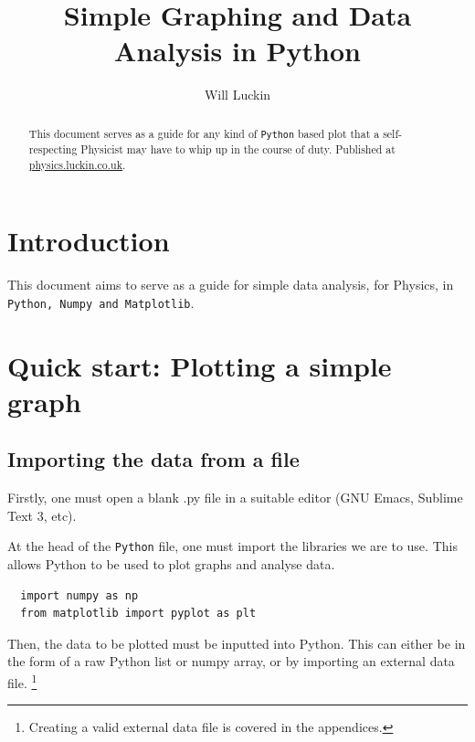 \documentclass{article}
\author{Will Luckin}
\title{Simple Graphing and Data Analysis in Python}
\begin{document}


\maketitle

\begin{abstract}
  This document serves as a guide for any kind of \texttt{Python}
  based plot that a self-respecting Physicist may have to whip up in
  the course of duty.
  Published at \url{physics.luckin.co.uk}.
\end{abstract}

\tableofcontents
\newpage

\section{Introduction}
This document aims to serve as a guide for simple data analysis, for
Physics, in \texttt{Python, Numpy and Matplotlib}.  

\section{Quick start: Plotting a simple graph}
\subsection{Importing the data from a file}
Firstly, one must open a blank .py file in a suitable editor (GNU
Emacs, Sublime Text 3, etc).

At the head of the \texttt{Python} file, one must import the libraries
we are to use. This allows Python to be used to plot graphs and
analyse data.

\begin{lstlisting}
  import numpy as np
  from matplotlib import pyplot as plt
\end{lstlisting}

Then, the data to be plotted must be inputted into Python. This can
either be in the form of a raw Python list or numpy array, or by
importing an external data file. \footnote{Creating a valid external
  data file is covered in the appendices.}
\end{document}
